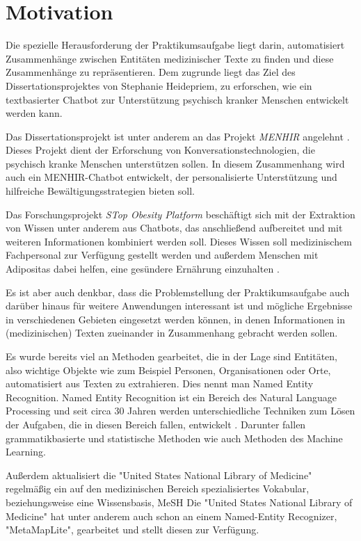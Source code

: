 \section{Motivation}

Die spezielle Herausforderung der Praktikumsaufgabe liegt darin, automatisiert Zusammenhänge zwischen Entitäten medizinischer Texte zu finden und diese Zusammenhänge zu repräsentieren. Dem zugrunde liegt das Ziel des Dissertationsprojektes von Stephanie Heidepriem, zu erforschen, wie ein textbasierter Chatbot zur Unterstützung 
psychisch kranker Menschen entwickelt werden kann. 

Das Dissertationsprojekt  ist unter anderem an das Projekt \emph{MENHIR} angelehnt \cite{menhir}. Dieses Projekt dient der Erforschung von Konversationstechnologien, die psychisch kranke Menschen unterstützen sollen. In diesem Zusammenhang wird auch 
ein MENHIR-Chatbot entwickelt, der personalisierte Unterstützung und hilfreiche Bewältigungsstrategien bieten soll. 

Das Forschungsprojekt \emph{STop Obesity Platform} beschäftigt sich mit der Extraktion von Wissen unter anderem aus Chatbots, das anschließend aufbereitet und mit weiteren Informationen kombiniert werden soll. Dieses Wissen soll medizinischem Fachpersonal zur Verfügung gestellt werden und außerdem Menschen mit Adipositas dabei helfen, eine gesündere Ernährung einzuhalten \cite{stopobesity}.


Es ist aber auch denkbar, dass die Problemstellung der Praktikumsaufgabe auch darüber hinaus für weitere Anwendungen interessant ist und mögliche Ergebnisse in verschiedenen Gebieten eingesetzt werden können, in denen Informationen in (medizinischen) Texten zueinander in Zusammenhang gebracht werden sollen.

Es wurde bereits viel an Methoden gearbeitet, die in der Lage sind Entitäten, also wichtige Objekte wie zum Beispiel Personen, 
Organisationen oder Orte, automatisiert aus Texten zu extrahieren. Dies nennt man Named Entity Recognition. Named Entity 
Recognition ist ein Bereich des Natural Language Processing und seit circa 30 Jahren werden unterschiedliche Techniken 
zum Lösen der Aufgaben, die in diesen Bereich fallen, entwickelt \cite{trends_in_ner}. Darunter fallen 
grammatikbasierte und statistische Methoden wie auch Methoden des Machine Learning.

Außerdem aktualisiert die "United States National Library of Medicine" regelmäßig ein auf den medizinischen Bereich 
spezialisiertes Vokabular, beziehungsweise eine Wissensbasis, MeSH \cite{mesh}
Die "United States National Library of Medicine" hat unter anderem auch schon an einem Named-Entity Recognizer,
"MetaMapLite", gearbeitet und stellt diesen zur Verfügung. \cite{metamaplite}

